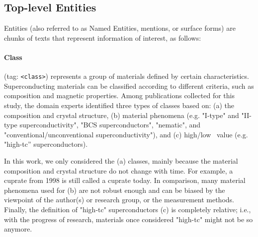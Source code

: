 \subsection{Top-level Entities}
Entities (also referred to as Named Entities, mentions, or surface forms) are chunks of texts that represent information of interest, as follows: 

\paragraph{Class} (tag: \texttt{<class>}) represents a group of materials defined by certain characteristics.
Superconducting materials can be classified according to different criteria, such as composition and magnetic properties. 
Among publications collected for this study, the domain experts identified three types of classes based on: (a) the composition and crystal structure, (b) material phenomena (e.g. "I-type" and "II-type superconductivity", "BCS superconductors", "nematic", and "conventional/unconventional superconductivity"), and (c) high/low \tc~value (e.g. "high-tc” superconductors). 

In this work, we only considered the (a) classes, mainly because the material composition and crystal structure do not change with time. For example, a cuprate from 1998 is still called a cuprate today. 
In comparison, many material phenomena used for (b) are not robust enough and can be biased by the viewpoint of the author(s) or research group, or the measurement methods. 
Finally, the definition of "high-tc" superconductors (c) is completely relative; i.e., with the progress of research, materials once considered "high-tc" might not be so anymore.

